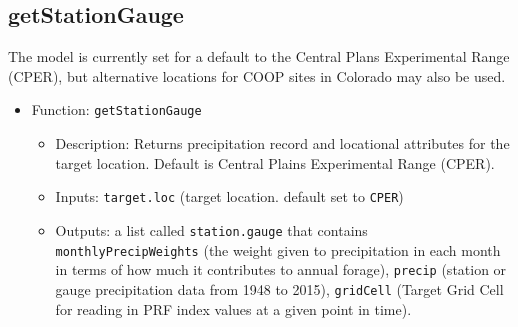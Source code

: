 \documentclass[11pt]{article}
\begin{document}
\subsection{getStationGauge}
The model is currently set for a default to the Central Plans Experimental Range (CPER), but alternative locations for COOP sites in Colorado may also be used.

\begin{itemize}
\item Function: \verb!getStationGauge!
	\begin{itemize}
	\item Description: Returns precipitation record and locational attributes for the target
  location. Default is Central Plains Experimental Range (CPER).
  \item Inputs: \verb!target.loc! (target location. default set to \verb!CPER!)
  \item Outputs: a list called \verb!station.gauge! that contains \verb!monthlyPrecipWeights! (the weight given to precipitation in each month in terms of how much it contributes to annual forage), \verb!precip! (station or gauge precipitation data from 1948 to 2015), \verb!gridCell! (Target Grid Cell for reading in PRF index values at a given point in time).
	\end{itemize}
\end{itemize}
\end{document}
